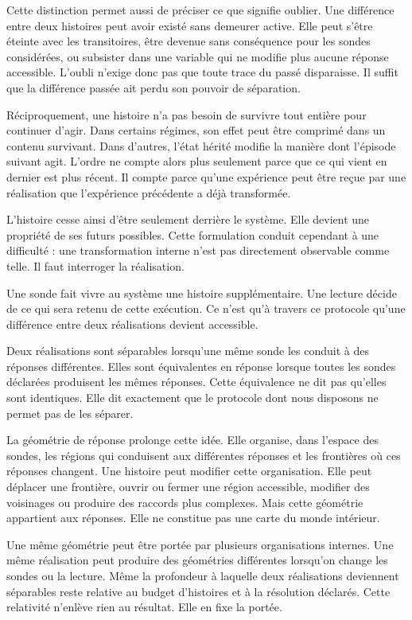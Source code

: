 \documentclass[
  11pt,
  a4paper,
  openany]{book}
\theoremstyle{definition}
\begin{document}
Cette distinction permet aussi de préciser ce que signifie oublier. Une différence entre deux histoires peut avoir existé sans demeurer active. Elle peut s'être éteinte avec les transitoires, être devenue sans conséquence pour les sondes considérées, ou subsister dans une variable qui ne modifie plus aucune réponse accessible. L'oubli n'exige donc pas que toute trace du passé disparaisse. Il suffit que la différence passée ait perdu son pouvoir de séparation.

Réciproquement, une histoire n'a pas besoin de survivre tout entière pour continuer d'agir. Dans certains régimes, son effet peut être comprimé dans un contenu survivant. Dans d'autres, l'état hérité modifie la manière dont l'épisode suivant agit. L'ordre ne compte alors plus seulement parce que ce qui vient en dernier est plus récent. Il compte parce qu'une expérience peut être reçue par une réalisation que l'expérience précédente a déjà transformée.

L'histoire cesse ainsi d'être seulement derrière le système. Elle devient une propriété de ses futurs possibles. Cette formulation conduit cependant à une difficulté : une transformation interne n'est pas directement observable comme telle. Il faut interroger la réalisation.

Une sonde fait vivre au système une histoire supplémentaire. Une lecture décide de ce qui sera retenu de cette exécution. Ce n'est qu'à travers ce protocole qu'une différence entre deux réalisations devient accessible.

Deux réalisations sont séparables lorsqu'une même sonde les conduit à des réponses différentes. Elles sont équivalentes en réponse lorsque toutes les sondes déclarées produisent les mêmes réponses. Cette équivalence ne dit pas qu'elles sont identiques. Elle dit exactement que le protocole dont nous disposons ne permet pas de les séparer.

La géométrie de réponse prolonge cette idée. Elle organise, dans l'espace des sondes, les régions qui conduisent aux différentes réponses et les frontières où ces réponses changent. Une histoire peut modifier cette organisation. Elle peut déplacer une frontière, ouvrir ou fermer une région accessible, modifier des voisinages ou produire des raccords plus complexes. Mais cette géométrie appartient aux réponses. Elle ne constitue pas une carte du monde intérieur.

Une même géométrie peut être portée par plusieurs organisations internes. Une même réalisation peut produire des géométries différentes lorsqu'on change les sondes ou la lecture. Même la profondeur à laquelle deux réalisations deviennent séparables reste relative au budget d'histoires et à la résolution déclarés. Cette relativité n'enlève rien au résultat. Elle en fixe la portée.
\end{document}
